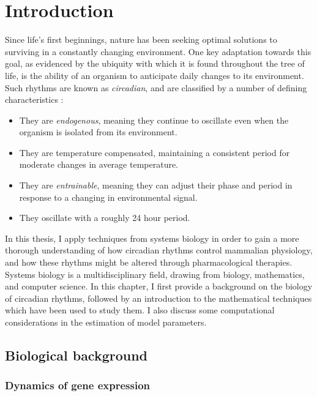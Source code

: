 \chapter{Introduction}
Since life's first beginnings, nature has been seeking optimal solutions to surviving in a constantly changing environment.
One key adaptation towards this goal, as evidenced by the ubiquity with which it is found throughout the tree of life, is the ability of an organism to anticipate daily changes to its environment.
Such rhythms are known as {\itshape circadian}, and are classified by a number of defining characteristics \cite{Dunlap2009}:

\begin{itemize}
  \item They are {\em endogenous}, meaning they continue to oscillate even when the organism is isolated from its environment.

  \item They are temperature compensated, maintaining a consistent period for moderate changes in average temperature.

  \item They are {\em entrainable}, meaning they can adjust their phase and period in response to a changing in environmental signal.

  \item They oscillate with a roughly 24 hour period.
\end{itemize}

In this thesis, I apply techniques from systems biology in order to gain a more thorough understanding of how circadian rhythms control mammalian physiology, and how these rhythms might be altered through pharmacological therapies. %
Systems biology is a multidisciplinary field, drawing from biology, mathematics, and computer science. 
In this chapter, I first provide a background on the biology of circadian rhythms, followed by an introduction to the mathematical techniques which have been used to study them. 
I also discuss some computational considerations in the estimation of model parameters.

\section{Biological background}

\subsection{Dynamics of gene expression}

